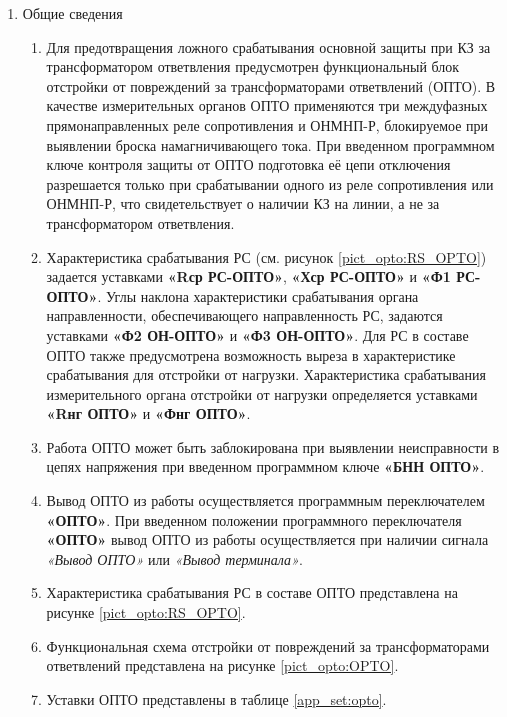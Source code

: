 \begin{enumerate}
\item Общие сведения
\begin{enumerate}
\item Для предотвращения ложного срабатывания основной защиты при КЗ за трансформатором ответвления предусмотрен функциональный блок отстройки от повреждений за трансформаторами ответвлений (ОПТО). В качестве измерительных органов ОПТО применяются три междуфазных прямонаправленных реле сопротивления и ОНМНП-Р, блокируемое при выявлении броска намагничивающего тока. При введенном программном ключе контроля защиты от ОПТО подготовка её цепи отключения разрешается только при срабатывании одного из реле сопротивления или ОНМНП-Р, что свидетельствует о наличии КЗ на линии, а не за трансформатором ответвления.
\item Характеристика срабатывания РС (см. рисунок \ref{pict_opto:RS_OPTO}) задается уставками \textbf{«Rср РС-ОПТО»}, \textbf{«Хср РС-ОПТО»} и \textbf{«Ф1 РС-ОПТО»}. Углы наклона характеристики срабатывания органа направленности, обеспечивающего направленность РС, задаются уставками \textbf{«Ф2 ОН-ОПТО»} и \textbf{«Ф3 ОН-ОПТО»}. Для РС в составе ОПТО также предусмотрена возможность выреза в характеристике срабатывания для отстройки от нагрузки. Характеристика срабатывания измерительного органа отстройки от нагрузки определяется уставками \textbf{«Rнг ОПТО»} и \textbf{«Фнг ОПТО»}.
\item Работа ОПТО может быть заблокирована при выявлении неисправности в цепях напряжения при введенном программном ключе \textbf{«БНН ОПТО»}.
\item Вывод ОПТО из работы осуществляется программным переключателем \textbf{«ОПТО»}. При введенном положении программного переключателя \textbf{«ОПТО»} вывод ОПТО из работы осуществляется при наличии сигнала \textit{«Вывод ОПТО»} или \textit{«Вывод терминала»}.
\item Характеристика срабатывания РС в составе ОПТО представлена на рисунке \ref{pict_opto:RS_OPTO}.
\item Функциональная схема отстройки от повреждений за трансформаторами ответвлений представлена на рисунке \ref{pict_opto:OPTO}.
\item Уставки ОПТО представлены в таблице \ref{app_set:opto}.
\end{enumerate}

\end{enumerate}